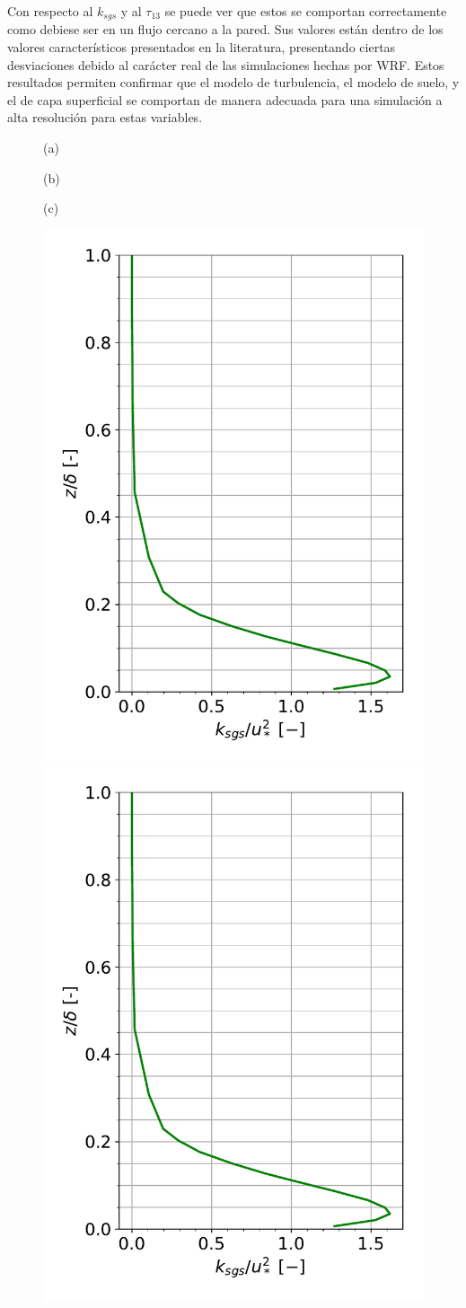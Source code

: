 Con respecto al $k_{sgs}$ y al $\tau_{13}$ se puede ver que estos se comportan correctamente como debiese ser en un flujo cercano a la pared. Sus valores están dentro de los valores característicos presentados en la literatura, presentando ciertas desviaciones debido al carácter real de las simulaciones hechas por WRF. Estos resultados permiten confirmar que el modelo de turbulencia, el modelo de suelo, y el de capa superficial se comportan de manera adecuada para una simulación a alta resolución para estas variables.

\begin{figure}[H]
	\begin{minipage}{0.33\linewidth}
		\centering \hspace{1cm}(a)
	\end{minipage}%
	\begin{minipage}{0.33\linewidth}
		\centering \hspace{0.8cm}(b)
	\end{minipage}%
	\begin{minipage}{0.33\linewidth}
		\centering \hspace{0.5cm}(c)
	\end{minipage}%
	\vspace{-4mm}
	\begin{center}
	\includegraphics[height=0.5\linewidth,page=1,trim={6mm 5mm 3mm 0mm},clip]{Imagenes/06/hov/mean_data}%
	\includegraphics[height=0.5\linewidth,page=2,trim={12mm 5mm 3mm 0mm},clip]{Imagenes/06/hov/mean_data}%

\end{center}
\end{figure}
